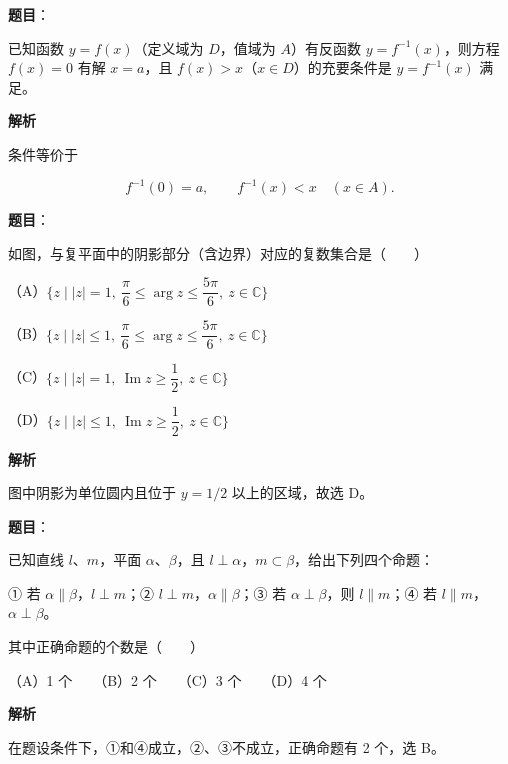 \begin{answer}

\textbf{题目}：

已知函数 $y=f(x)$（定义域为 $D$，值域为 $A$）有反函数 $y=f^{-1}(x)$，则方程 $f(x)=0$ 有解 $x=a$，且 $f(x)>x$（$x\in D$）的充要条件是 $y=f^{-1}(x)$ 满足\gkblank{}。

\textbf{解析}

条件等价于

\nopagebreak[4]
\[
f^{-1}(0)=a,\qquad f^{-1}(x)<x\quad(x\in A).
\]


\end{answer}

\begin{answer}

\textbf{题目}：

如图，与复平面中的阴影部分（含边界）对应的复数集合是\mbox{（　　）}
\nopagebreak[4]
\begin{center}\end{center}
\nopagebreak[4]
（A）$\{z\mid |z|=1,\ \dfrac\pi6\le\arg z\le\dfrac{5\pi}6,\ z\in\mathbb C\}$

（B）$\{z\mid |z|\le1,\ \dfrac\pi6\le\arg z\le\dfrac{5\pi}6,\ z\in\mathbb C\}$

（C）$\{z\mid |z|=1,\ \operatorname{Im}z\ge\dfrac12,\ z\in\mathbb C\}$

（D）$\{z\mid |z|\le1,\ \operatorname{Im}z\ge\dfrac12,\ z\in\mathbb C\}$

\textbf{解析}

图中阴影为单位圆内且位于 $y=1/2$ 以上的区域，故选 D。


\end{answer}
\begin{answer}

\textbf{题目}：

已知直线 $l\text{、}m$，平面 $\alpha\text{、}\beta$，且 $l\perp\alpha$，$m\subset\beta$，给出下列四个命题：

① 若 $\alpha\parallel\beta$，$l\perp m$；② $l\perp m$，$\alpha\parallel\beta$；③ 若 $\alpha\perp\beta$，则 $l\parallel m$；④ 若 $l\parallel m$，$\alpha\perp\beta$。

其中正确命题的个数是\mbox{（　　）}

（A）1 个　　（B）2 个　　（C）3 个　　（D）4 个

\textbf{解析}

在题设条件下，①和④成立，②、③不成立，正确命题有 2 个，选 B。


\end{answer}
